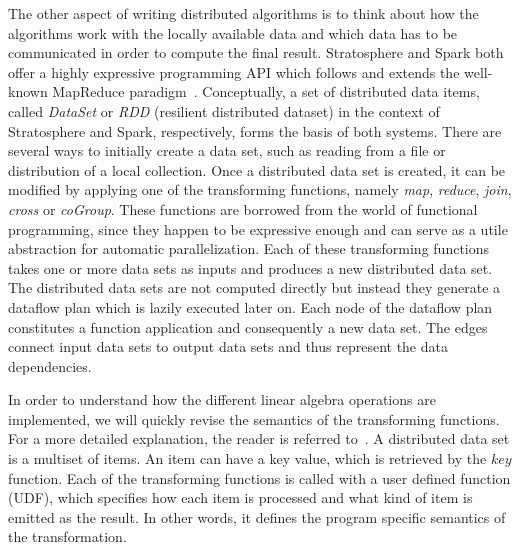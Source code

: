 The other aspect of writing distributed algorithms is to think about how the algorithms work with the locally available data and which data has to be communicated in order to compute the final result.
Stratosphere and Spark both offer a highly expressive programming API which follows and extends the well-known MapReduce paradigm~\cite{dean:c2008a}.
Conceptually, a set of distributed data items, called \emph{DataSet} or \emph{RDD} (resilient distributed dataset) in the context of Stratosphere and Spark, respectively, forms the basis of both systems.
There are several ways to initially create a data set, such as reading from a file or distribution of a local collection.
Once a distributed data set is created, it can be modified by applying one of the transforming functions, namely \emph{map}, \emph{reduce}, \emph{join}, \emph{cross} or \emph{coGroup}.
These functions are borrowed from the world of functional programming, since they happen to be expressive enough and can serve as a utile abstraction for automatic parallelization.
Each of these transforming functions takes one or more data sets as inputs and produces a new distributed data set.
The distributed data sets are not computed directly but instead they generate a dataflow plan which is lazily executed later on.
Each node of the dataflow plan constitutes a function application and consequently a new data set.
The edges connect input data sets to output data sets and thus represent the data dependencies.

In order to understand how the different linear algebra operations are implemented, we will quickly revise the semantics of the transforming functions.
For a more detailed explanation, the reader is referred to~\cite{zaharia:2012a,alexandrov:2011a,battre:2010a}.
A distributed data set is a multiset of items.
An item can have a key value, which is retrieved by the $key$ function.
Each of the transforming functions is called with a user defined function (UDF), which specifies how each item is processed and what kind of item is emitted as the result.
In other words, it defines the program specific semantics of the transformation.

